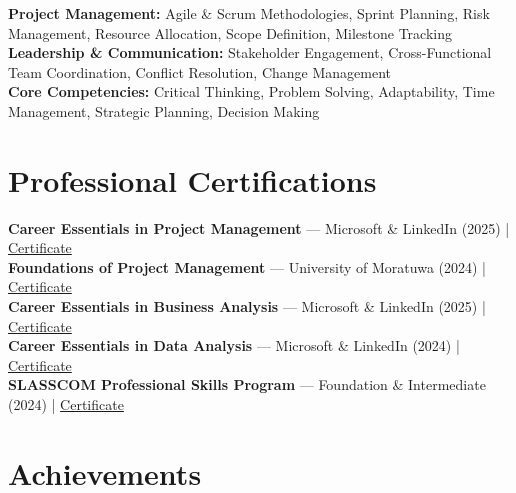 \documentclass[letterpaper,10.8pt]{article}
\begin{document}
\textbf{Project Management:} Agile \& Scrum Methodologies, Sprint Planning, Risk Management, Resource Allocation, Scope Definition, Milestone Tracking\\[4pt]
\textbf{Leadership \& Communication:} Stakeholder Engagement, Cross-Functional Team Coordination, Conflict Resolution, Change Management\\[4pt]
\textbf{Core Competencies:} Critical Thinking, Problem Solving, Adaptability, Time Management, Strategic Planning, Decision Making

\section{Professional Certifications}
\vspace{-1pt}

\textbf{Career Essentials in Project Management} — Microsoft \& LinkedIn (2025) | \href{https://www.linkedin.com/posts/vindya-kodithuwakku-bb6187202_projectmanagement-careeressentials-microsoft-activity-7374470702059438080-zbfj}{Certificate}\\[3pt]
\textbf{Foundations of Project Management} — University of Moratuwa (2024) | \href{https://open.uom.lk/lms/mod/customcert/verify_certificate.php?code=ATuxOYBBAE&qrcode=1}{Certificate}\\[3pt]
\textbf{Career Essentials in Business Analysis} — Microsoft \& LinkedIn (2025) | \href{https://www.linkedin.com/posts/vindya-kodithuwakku-bb6187202_businessanalysis-careeressentials-microsoft-activity-7371193871919398914-PKak}{Certificate}\\[3pt]
\textbf{Career Essentials in Data Analysis} — Microsoft \& LinkedIn (2024) | \href{https://www.linkedin.com/posts/vindya-kodithuwakku-bb6187202_dataanalysis-careeressentials-microsoft-activity-7379124237950750720-kKmD}{Certificate}\\[3pt]
\textbf{SLASSCOM Professional Skills Program} — Foundation \& Intermediate (2024) | \href{https://www.linkedin.com/posts/vindya-kodithuwakku-bb6187202_slasscom-professionalskillsprogram-careerdevelopment-activity-7379038487246860288-PRA0}{Certificate}

\section{Achievements}
\vspace{-1pt}
\end{document}
